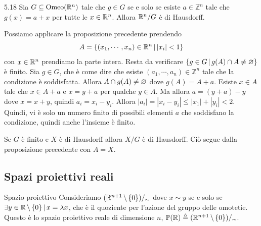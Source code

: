 \documentclass[a4paper]{article}
\begin{document}
\begin{snippetexample}{5.18}
    Sia \(G \subseteq \text{Omeo}(\mathbb{R}^n)\) tale che \(g \in G\)
    se e solo se esiste \(a \in \mathbb{Z}^n\)
    tale che \(g(x) = a + x\) per tutte le \(x \in \mathbb{R}^n\).
    Allora \(\mathbb{R}^n / G\) è di Hausdorff.
\end{snippetexample}

\begin{snippetproof}{}
    Possiamo applicare la proposizione precedente prendendo
    \[
        A = \{(x_1, \cdots, x_n) \in \mathbb{R}^n \,|\, |x_i| < 1\}
    \]
    con \(x \in \mathbb{R}^n\) prendiamo la parte intera.
    Resta da verificare \(\{g \in G \,|\, g(A) \cap A \neq \varnothing\}\) è finito.
    Sia \(g \in G\), che è come dire che esiste \((a_1, \cdots, a_n) \in \mathbb{Z}^n\)
    tale che la condizione è soddisfatta.
    Allora \(A \cap g(A) \neq \varnothing\) dove \(g(A) = A+a\).
    Esiste \(x\in A\) tale che \(x\in A + a\) e \(x=y+a\) per qualche \(y\in A\).
    Ma allora \(a = (y + a) - y\) dove \(x = x+y\),
    quindi \(a_i= x_i - y_i\).
    Allora \(|a_i| = |x_i - y_i| \leq |x_1| + |y_i| < 2\).
    Quindi, vi è solo un numero finito di possibili elementi \(a\)
    che soddisfano la condizione, quindi anche l'insieme è finito.
\end{snippetproof}

Se \(G\) è finito e \(X\) è di Hausdorff allora \(X/G\) è di Hausdorff.
Ciò segue dalla proposizione precedente con \(A=X\).

\subsection{Spazi proiettivi reali}

\begin{radioactive}
\begin{snippetdefinition}{Spazio proiettivo}
    Consideriamo \((\mathbb{R}^{n+1} \,\backslash\, \{0\}) /_\sim\)
    dove \(x \sim y\) se e solo se \(\exists y \in \mathbb{R} \,\backslash\, \{0\} \,|\, x = \lambda x\),
    che è il quoziente per l'azione del gruppo delle omotetie.
    Questo è lo spazio proiettivo reale di dimensione \(n\), \(\mathbb{P}(\mathbb{R}) \triangleq (\mathbb{R}^{n+1} \,\backslash\, \{0\}) /_\sim\).
\end{snippetdefinition}
\end{radioactive}
\end{document}
